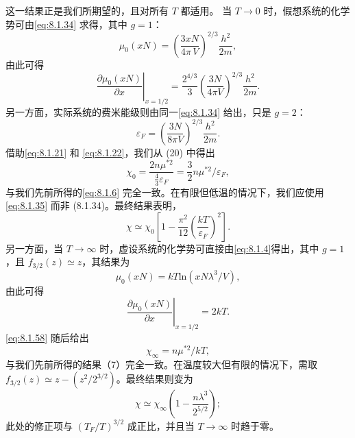 这一结果正是我们所期望的，且对所有 \(T\) 都适用。
当 \(T\to0\) 时，假想系统的化学势可由\autoref{eq:8.1.34} 求得，其中 \(g=1\)：
\begin{equation}\tag{8.1.59}\label{eq:8.1.59}
\mu _ { 0 } ( x N ) = \left( \frac { 3 x N } { 4 \pi \, V } \right) ^{2 / 3} \frac { h ^{2} } { 2 m } ,
\end{equation}
由此可得
\begin{equation}\tag{8.1.60}\label{eq:8.1.60}
\left. \frac { \partial \mu _ { 0 } ( x N ) } { \partial x } \right| _ { x = 1 / 2 } = \frac { 2 ^{4 / 3} } { 3 } \left( \frac { 3 N } { 4 \pi V } \right) ^{2 / 3} \frac { h ^{2} } { 2 m } .
\end{equation}
另一方面，实际系统的费米能级则由同一\autoref{eq:8.1.34} 给出，只是 \(g=2\)：
\begin{equation}\tag{8.1.61}\label{eq:8.1.61}
\varepsilon _ { F } = \left( \frac { 3 N } { 8 \pi V } \right) ^{2 / 3} \frac { h ^{2} } { 2 m } .
\end{equation}
借助\autoref{eq:8.1.21} 和 \autoref{eq:8.1.22}，我们从 (20) 中得出
\begin{equation}\tag{8.1.62}\label{eq:8.1.62}
\chi _ { 0 } = \frac { 2 n \mu ^{* 2} } { \frac { 4 } { 3 } \varepsilon _ { F } } = \frac { 3 } { 2 } n \mu ^{* 2} / \varepsilon _ { F } ,
\end{equation}
与我们先前所得的\autoref{eq:8.1.6} 完全一致。在有限但低温的情况下，我们应使用\autoref{eq:8.1.35} 而非 (8.1.34)。最终结果表明，
\begin{equation}\tag{8.1.63}\label{eq:8.1.63}
\chi \simeq \chi _ { 0 } \left[ 1 - \frac { \pi ^{2} } { 12 } \left( \frac { k T } { \varepsilon _ { F } } \right) ^{2} \right] .
\end{equation}
另一方面，当 \(T \to \infty\) 时，虚设系统的化学势可直接由\autoref{eq:8.1.4}得出，其中 \(g=1\)，且 \(f_{3/2}(z) \simeq z\)，其结果为
\begin{equation}\tag{8.1.64}\label{eq:8.1.64}
\mu _ { 0 } ( x N ) = k T \mathrm { l n } ( x N \lambda ^{3} / V ) ,
\end{equation}
由此可得
\begin{equation}\tag{8.1.65}\label{eq:8.1.65}
\left. \frac { \partial \mu _ { 0 } ( x N ) } { \partial x } \right| _ { x = 1 / 2 } = 2 k T .
\end{equation}
\autoref{eq:8.1.58} 随后给出
\begin{equation}\tag{8.1.66}\label{eq:8.1.66}
\chi _ { \infty } = n \mu ^{* 2} / k T ,
\end{equation}
与我们先前所得的结果（7）完全一致。在温度较大但有限的情况下，需取 \(f_{3/2}(z) \simeq z - (z^2/2^{3/2})\)。最终结果则变为
\begin{equation}\tag{8.1.67}\label{eq:8.1.67}
\chi \simeq \chi _ { \infty } \left( 1 - \frac { n \lambda ^{3} } { 2 ^{5 / 2} } \right) ;
\end{equation}
此处的修正项与 \((T_F/T)^{3/2}\) 成正比，并且当 \(T \to \infty\) 时趋于零。
